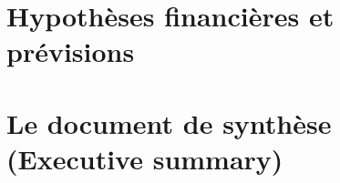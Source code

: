 \documentclass[a4paper,12pt]{report}
\begin{document}
\section{Hypothèses financières et prévisions}
\section{Le document de synthèse (Executive summary)}
\end{document}
